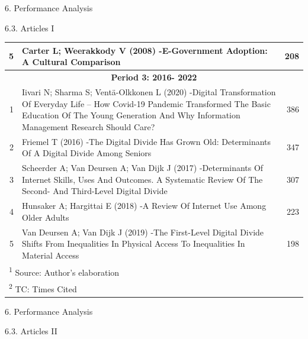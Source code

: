 \documentclass[
  ignorenonframetext,
]{beamer}
\begin{document}
\begin{frame}{6. Performance Analysis}
\begin{block}{6.3. Articles I}
\begin{table}
\begin{tabular}[t]{r|p{9cm}|r}
\hline
\hspace{1em}5 & Carter L; Weerakkody V (2008) -E-Government Adoption: A Cultural Comparison & 208\\
\hline
\multicolumn{3}{c}{\textbf{Period 3: 2016- 2022}}\\
\hline
\hspace{1em}1 & Iivari N; Sharma S; Ventä-Olkkonen L (2020) -Digital Transformation Of Everyday Life – How Covid-19 Pandemic Transformed The Basic Education Of The Young Generation And Why Information Management Research Should Care? & 386\\
\hline
\hspace{1em}2 & Friemel T (2016) -The Digital Divide Has Grown Old: Determinants Of A Digital Divide Among Seniors & 347\\
\hline
\hspace{1em}3 & Scheerder A; Van Deursen A; Van Dijk J (2017) -Determinants Of Internet Skills, Uses And Outcomes. A Systematic Review Of The Second- And Third-Level Digital Divide & 307\\
\hline
\hspace{1em}4 & Hunsaker A; Hargittai E (2018) -A Review Of Internet Use Among Older Adults & 223\\
\hline
\hspace{1em}5 & Van Deursen A; Van Dijk J (2019) -The First-Level Digital Divide Shifts From Inequalities In Physical Access To Inequalities In Material Access & 198\\
\hline
\multicolumn{3}{l}{\textsuperscript{1} Source: Author's elaboration}\\
\multicolumn{3}{l}{\textsuperscript{2} TC: Times Cited}\\
\end{tabular}
\end{table}
\end{block}
\end{frame}

\begin{frame}{6. Performance Analysis}
\protect\hypertarget{performance-analysis-3}{}
\begin{block}{6.3. Articles II}
\protect\hypertarget{articles-ii}{}
\end{block}
\end{frame}
\end{document}
